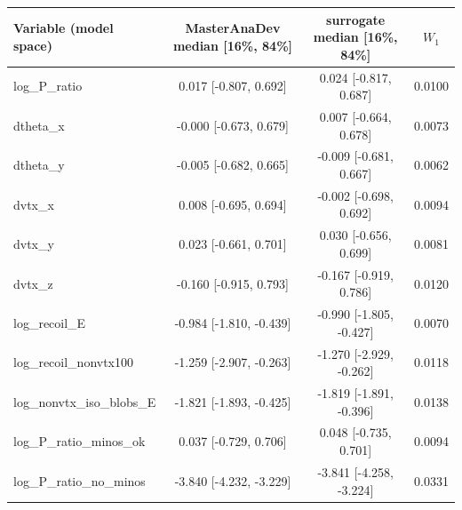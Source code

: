 \begin{tabular}{lccc}
\toprule
Variable (model space) & MasterAnaDev median [16\%, 84\%] & surrogate median [16\%, 84\%] & $W_1$ \\
\midrule
log\_P\_ratio & 0.017 [-0.807, 0.692] & 0.024 [-0.817, 0.687] & 0.0100 \\
dtheta\_x & -0.000 [-0.673, 0.679] & 0.007 [-0.664, 0.678] & 0.0073 \\
dtheta\_y & -0.005 [-0.682, 0.665] & -0.009 [-0.681, 0.667] & 0.0062 \\
dvtx\_x & 0.008 [-0.695, 0.694] & -0.002 [-0.698, 0.692] & 0.0094 \\
dvtx\_y & 0.023 [-0.661, 0.701] & 0.030 [-0.656, 0.699] & 0.0081 \\
dvtx\_z & -0.160 [-0.915, 0.793] & -0.167 [-0.919, 0.786] & 0.0120 \\
log\_recoil\_E & -0.984 [-1.810, -0.439] & -0.990 [-1.805, -0.427] & 0.0070 \\
log\_recoil\_nonvtx100 & -1.259 [-2.907, -0.263] & -1.270 [-2.929, -0.262] & 0.0118 \\
log\_nonvtx\_iso\_blobs\_E & -1.821 [-1.893, -0.425] & -1.819 [-1.891, -0.396] & 0.0138 \\
log\_P\_ratio\_minos\_ok & 0.037 [-0.729, 0.706] & 0.048 [-0.735, 0.701] & 0.0094 \\
log\_P\_ratio\_no\_minos & -3.840 [-4.232, -3.229] & -3.841 [-4.258, -3.224] & 0.0331 \\
\bottomrule
\end{tabular}

